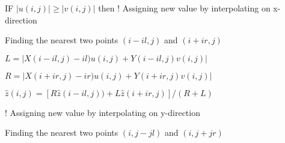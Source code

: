 \documentclass[review]{elsarticle}
\theoremstyle{plain}\newtheorem{definition}{\sc{Definition}}
\theoremstyle{defination}\newtheorem{example}{Example}[section]
\numberwithin{equation}{section}
\numberwithin{table}{section}
\begin{document}
{{{{{{\hspace{2cm} {\color{black!60!blue!80}IF}
{\color{black!80} $|u(i,j)|\geqslant |v(i,j)|$}{ \color{black!60!blue!80}then}
{ \color{black!60} \hspace{1.4cm} ! Assigning new value by interpolating on x-direction}
{\color{black!80}

%
%
%
%
%
%

\small
\hspace{2.5cm} \color{black!80} Finding the nearest two points $(i-il,j)$ and $(i+ir,j)$

\scriptsize
\vspace{0.1cm}
\color{black!80}
\hspace{2.5cm} $L=|X(i-il,j)-il)u(i,j)+Y(i-il,j)v(i,j)|$

\hspace{2.5cm} $R=|X(i+ir,j)-ir)u(i,j)+Y(i+ir,j)v(i,j)|$

\hspace{2.5cm} $\hat{z}(i,j)=[R\hat{z}(i-il,j))+L\hat{z}(i+ir,j)]/(R+L)$

\vspace{0.1cm}
{\color{black!80}
{ \color{black!60} \hspace{3.9cm} ! Assigning new value by interpolating on y-direction}
{\color{black!80}
\vspace{0.1cm}

%
%
%
%
%
%
\hspace{2.5cm} \color{black!80} 
\small
Finding the nearest two points $(i,j-jl)$ and $(i,j+jr)$


}}}}}}}}}
\end{document}
